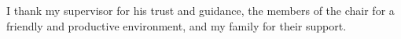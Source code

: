 I thank my supervisor for his trust and guidance, the members of the chair for a friendly and
productive environment, and my family for their support.
